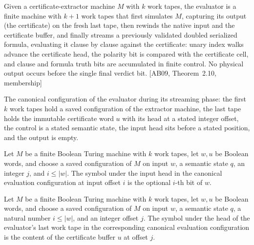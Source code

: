 \begin{definition}
\label{Complexity.satEvalTM}
\leanok
{}
Given a certificate-extractor machine $M$ with $k$ work tapes, the evaluator is a
finite machine with $k + 1$ work tapes that first simulates $M$, capturing its
output (the certificate) on the fresh last tape, then rewinds the native input and
the certificate buffer, and finally streams a previously validated doubled
serialized formula, evaluating it clause by clause against the certificate: unary
index walks advance the certificate head, the polarity bit is compared with the
certificate cell, and clause and formula truth bits are accumulated in finite
control. No physical output occurs before the single final verdict bit.
[AB09, Theorem~2.10, membership]
\end{definition}

\begin{definition}
\label{Complexity.satEvalCfg}
\leanok
{}
The canonical configuration of the evaluator during its streaming phase: the first
$k$ work tapes hold a saved configuration of the extractor machine, the last tape
holds the immutable certificate word $u$ with its head at a stated integer offset,
the control is a stated semantic state, the input head sits before a stated
position, and the output is empty.
\end{definition}

\begin{lemma}
\label{Complexity.satEvalCfg_input}
\leanok
{}
Let $M$ be a finite Boolean Turing machine with $k$ work tapes, let $w,u$ be Boolean
words, and choose a saved configuration of $M$ on input $w$, a semantic state $q$, an
integer $j$, and $i\le |w|$. The symbol under the input head in the canonical evaluation
configuration at input offset $i$ is the optional $i$-th bit of $w$.
\end{lemma}

\begin{lemma}
\label{Complexity.satEvalCfg_work}
\leanok
{}
Let $M$ be a finite Boolean Turing machine with $k$ work tapes, let $w,u$ be Boolean
words, and choose a saved configuration of $M$ on input $w$, a semantic state $q$, a
natural number $i\le |w|$, and an integer offset $j$. The symbol under the head of the
evaluator's last work tape in the corresponding canonical evaluation configuration is
the content of the certificate buffer $u$ at offset $j$.
\end{lemma}

